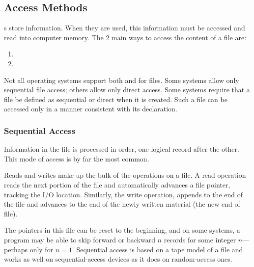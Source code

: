 \subsection{Access Methods}\label{subsec:Access_Methods}
s store information.
When they are used, this information must be accessed and read into computer memory.
The 2 main ways to access the content of a file are:
\begin{enumerate}[noitemsep]
\item {}
\item {}
\end{enumerate}

Not all operating systems support both  and  for files.
Some systems allow only sequential file access; others allow only direct access.
Some systems require that a file be defined as sequential or direct when it is created.
Such a file can be accessed only in a manner consistent with its declaration.

\subsubsection{Sequential Access}\label{subsubsec:Sequential_Access}
Information in the file is processed in order, one logical record after the other.
This mode of access is by far the most common.

Reads and writes make up the bulk of the operations on a file.
A read operation reads the next portion of the file and automatically advances a file pointer, tracking the I/O location.
Similarly, the write operation, appends to the end of the file and advances to the end of the newly written material (the new end of file).

The pointers in this file can be reset to the beginning, and on some systems, a program may be able to skip forward or backward $n$ records for some integer $n$—perhaps only for $n = 1$.
Sequential access is based on a tape model of a file and works as well on sequential-access devices as it does on random-access ones.


